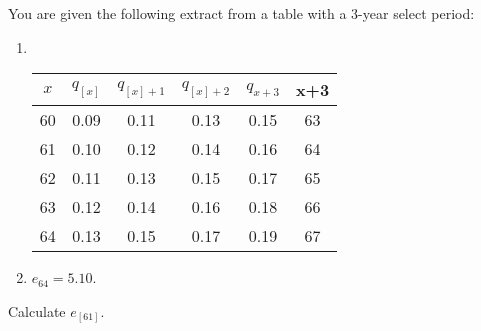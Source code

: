 You are given the following extract from a table with a 3-year select period:
\begin{enumerate}
\item \ \begin{center}\begin{tabular}{cccccc}
      $ x$  &   $q_{[x]}$ &   $q_{[x]+1}$&   $q_{[x]+2}$&   $q_{x+3}$ & x+3 \\ \hline
        60 & 0.09 & 0.11 & 0.13 & 0.15 & 63  \\
        61 & 0.10 & 0.12 & 0.14 & 0.16 & 64  \\
        62 & 0.11 & 0.13 & 0.15 & 0.17 & 65  \\
        63 & 0.12 & 0.14 & 0.16 & 0.18 & 66  \\
        64 & 0.13 & 0.15 & 0.17 & 0.19 & 67  
   \end{tabular}\end{center}
\medskip
\item $e_{64}=5.10$.
\end{enumerate}
Calculate $e_{[61]}$.
